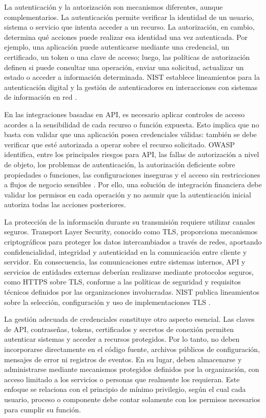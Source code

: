 La autenticación y la autorización son mecanismos diferentes, aunque complementarios. La autenticación permite verificar la identidad de un usuario, sistema o servicio que intenta acceder a un recurso. La autorización, en cambio, determina qué acciones puede realizar esa identidad una vez autenticada. Por ejemplo, una aplicación puede autenticarse mediante una credencial, un certificado, un token o una clave de acceso; luego, las políticas de autorización definen si puede consultar una operación, enviar una solicitud, actualizar un estado o acceder a información determinada. NIST establece lineamientos para la autenticación digital y la gestión de autenticadores en interacciones con sistemas de información en red \citep{nist2025}.

En las integraciones basadas en API, es necesario aplicar controles de acceso acordes a la sensibilidad de cada recurso o función expuesta. Esto implica que no basta con validar que una aplicación posea credenciales válidas: también se debe verificar que esté autorizada a operar sobre el recurso solicitado. OWASP identifica, entre los principales riesgos para API, las fallas de autorización a nivel de objeto, los problemas de autenticación, la autorización deficiente sobre propiedades o funciones, las configuraciones inseguras y el acceso sin restricciones a flujos de negocio sensibles \citep{owasp2023}. Por ello, una solución de integración financiera debe validar los permisos en cada operación y no asumir que la autenticación inicial autoriza todas las acciones posteriores.

La protección de la información durante su transmisión requiere utilizar canales seguros. Transport Layer Security, conocido como TLS, proporciona mecanismos criptográficos para proteger los datos intercambiados a través de redes, aportando confidencialidad, integridad y autenticidad en la comunicación entre cliente y servidor. En consecuencia, las comunicaciones entre sistemas internos, API y servicios de entidades externas deberían realizarse mediante protocolos seguros, como HTTPS sobre TLS, conforme a las políticas de seguridad y requisitos técnicos definidos por las organizaciones involucradas. NIST publica lineamientos sobre la selección, configuración y uso de implementaciones TLS \citep{mckay2019}.

La gestión adecuada de credenciales constituye otro aspecto esencial. Las claves de API, contraseñas, tokens, certificados y secretos de conexión permiten autenticar sistemas y acceder a recursos protegidos. Por lo tanto, no deben incorporarse directamente en el código fuente, archivos públicos de configuración, mensajes de error ni registros de eventos. En su lugar, deben almacenarse y administrarse mediante mecanismos protegidos definidos por la organización, con acceso limitado a los servicios o personas que realmente los requieran. Este enfoque se relaciona con el principio de mínimo privilegio, según el cual cada usuario, proceso o componente debe contar solamente con los permisos necesarios para cumplir su función.

